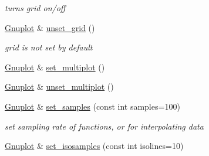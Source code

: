 \begin{DoxyCompactItemize}
\begin{DoxyCompactList}\small\item\em turns grid on/off \end{DoxyCompactList}\item 
\hyperlink{classkukadu_1_1Gnuplot}{Gnuplot} \& \hyperlink{classkukadu_1_1Gnuplot_a58316e0929ce39f1a50aefd528ba835e}{unset\+\_\+grid} ()\hypertarget{classkukadu_1_1Gnuplot_a58316e0929ce39f1a50aefd528ba835e}{}\label{classkukadu_1_1Gnuplot_a58316e0929ce39f1a50aefd528ba835e}

\begin{DoxyCompactList}\small\item\em grid is not set by default \end{DoxyCompactList}\item 
\hyperlink{classkukadu_1_1Gnuplot}{Gnuplot} \& \hyperlink{classkukadu_1_1Gnuplot_aab85e8b17756b471d3c800be4aab9cff}{set\+\_\+multiplot} ()
\item 
\hyperlink{classkukadu_1_1Gnuplot}{Gnuplot} \& \hyperlink{classkukadu_1_1Gnuplot_a91600bc5fa98295f48440bb211ba89db}{unset\+\_\+multiplot} ()
\item 
\hyperlink{classkukadu_1_1Gnuplot}{Gnuplot} \& \hyperlink{classkukadu_1_1Gnuplot_aed34438f8adfdd17b5b529e77eca3dd8}{set\+\_\+samples} (const int samples=100)\hypertarget{classkukadu_1_1Gnuplot_aed34438f8adfdd17b5b529e77eca3dd8}{}\label{classkukadu_1_1Gnuplot_aed34438f8adfdd17b5b529e77eca3dd8}

\begin{DoxyCompactList}\small\item\em set sampling rate of functions, or for interpolating data \end{DoxyCompactList}\item 
\hyperlink{classkukadu_1_1Gnuplot}{Gnuplot} \& \hyperlink{classkukadu_1_1Gnuplot_ae915b506a6ad7667635b1c8f2d41365e}{set\+\_\+isosamples} (const int isolines=10)\hypertarget{classkukadu_1_1Gnuplot_ae915b506a6ad7667635b1c8f2d41365e}{}\label{classkukadu_1_1Gnuplot_ae915b506a6ad7667635b1c8f2d41365e}


\end{DoxyCompactItemize}
